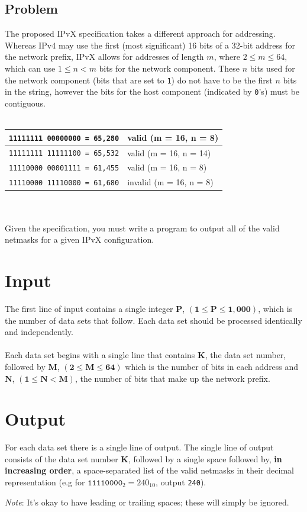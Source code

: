 \documentclass[11pt]{article}
\begin{document}
\subsection{Problem}
The proposed IPvX specification takes a different approach for addressing. Whereas IPv4 may use the first (most significant) 16 bits of a 32-bit address for the network prefix, IPvX allows for addresses of length $m$, where $2 \le m \le 64$, which can use $1 \le n < m$ bits for the network component. These $n$ bits used for the network component (bits that are set to \texttt{1}) do not have to be the first $n$ bits in the string, however the bits for the host component (indicated by \texttt{0}'s) must be contiguous.
\\\\ 
\begin{tabularx}{\textwidth}{|X|X|}
	\hline
	\texttt{11111111 00000000 = 65,280} & valid (m = 16, n = 8)\\ \hline
	\texttt{11111111 11111100 = 65,532} & valid (m = 16, n = 14)\\ \hline
	\texttt{11110000 00001111 = 61,455} & valid (m = 16, n = 8)\\ \hline
	\texttt{11110000 11110000 = 61,680} & invalid (m = 16, n = 8)\\ \hline
\end{tabularx}
\\\\
Given the specification, you must write a program to output all of the valid netmasks for a given IPvX configuration.

\section{Input}
The first line of input contains a single integer $\boldsymbol{P}$, $(\boldsymbol{1} \le \boldsymbol{P} \le \boldsymbol{1,000})$, which is the number of data sets that follow. Each
data set should be processed identically and independently.
\\\\
Each data set begins with a single line that contains $\boldsymbol{K}$, the data
set number, followed by $\boldsymbol{M}$, $(\boldsymbol{2} \le \boldsymbol{M} \le \boldsymbol{64})$
which is the number of bits in each address and  $\boldsymbol{N}$,
$(\boldsymbol{1} \le \boldsymbol{N} < \boldsymbol{M})$, the number of bits that make up the network prefix.

\section{Output}
For each data set there is a single line of output. The single line of output
consists of the data set number $\boldsymbol{K}$, followed by a single space
followed by, \textbf{in increasing order}, a space-separated list of the valid netmasks
in their decimal representation (e.g for $\texttt{11110000}_2 = 240_{10}$, output \texttt{240}).
\begin{center}\emph{Note}: It's okay to have leading or trailing spaces; these will simply be ignored.\end{center}
\end{document}
